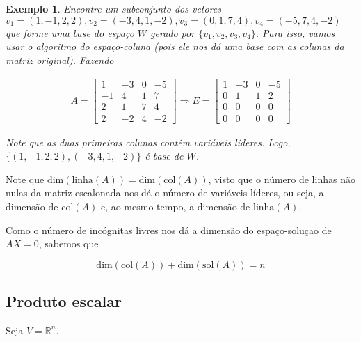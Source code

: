 \documentclass{article}
\newtheorem*{example}{Exemplo}
\begin{document}
\begin{example}
	Encontre um subconjunto dos vetores $v_1 = (1, -1, 2, 2), v_2 = (-3, 4, 1, -2), v_3 = (0, 1, 7, 4), v_4 = (-5, 7, 4, -2) $ que forme uma base do espaço $W$ gerado por $\{v_1, v_2, v_3, v_4\}$. Para isso, vamos usar o algoritmo do espaço-coluna (pois ele nos dá uma base com as colunas da matriz original). Fazendo
	
	\begin{align*}
	A = \begin{bmatrix}
	1 & -3 & 0 & -5 \\
	-1 & 4 & 1 & 7 \\
	2 & 1 & 7 & 4 \\
	2 & -2 & 4 & -2 
	\end{bmatrix}\Rightarrow E = \begin{bmatrix}
	1 & -3 & 0 & -5 \\
	0 & 1 & 1 & 2 \\
	0 & 0 & 0 & 0 \\
	0 & 0 & 0 & 0
	\end{bmatrix}
	\end{align*}
	
	\par\vspace{0.3cm} Note que as duas primeiras colunas contêm variáveis líderes. Logo, $\{ (1, -1, 2, 2), (-3, 4, 1, -2) \}$ é base de $W$.
	
\end{example}

\par\vspace{0.3cm} Note que $\text{dim}(\text{linha}(A)) = \text{dim}(\text{col}(A))$, visto que o número de linhas não nulas da matriz escalonada nos dá o número de variáveis líderes, ou seja, a dimensão de $\text{col}(A)$ e, ao mesmo tempo, a dimensão de $\text{linha}(A)$.

\par\vspace{0.3cm} Como o número de incógnitas livres nos dá a dimensão do espaço-soluçao de $AX = 0$, sabemos que

\begin{equation*}
\text{dim}(\text{col}(A)) + \text{dim}(\text{sol}(A)) = n
\end{equation*}

\subsection{Produto escalar}
\hspace{12pt} Seja $V = \mathbb{R}^n$.
\end{document}
